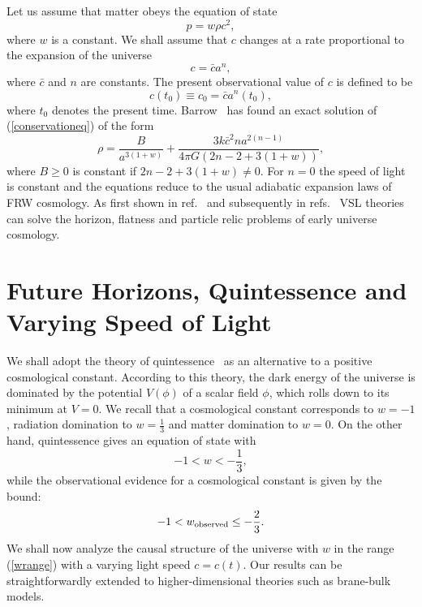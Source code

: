 \documentclass[a4paper,12pt]{article}
\begin{document}
Let us assume that matter obeys the equation of state
\begin{equation}
p=w\rho c^2,
\end{equation}
where $w$ is a constant. We shall assume that $c$ changes at a rate
proportional to the expansion of the universe
\begin{equation}
c={\bar c}a^n,
\end{equation}
where ${\bar c}$ and $n$ are constants. The present observational value of
$c$ is defined to be
\begin{equation}
c(t_0)\equiv c_0={\bar c}a^n(t_0),
\end{equation}
where $t_0$ denotes the present time.
Barrow~\cite{Barrow} has found an exact
solution of (\ref{conservationeq}) of the form
\begin{equation}
\rho=\frac{B}{a^{3(1+w)}}+\frac{3k{\bar c}^2na^{2(n-1)}} {4\pi
G(2n-2+3(1+w))},
\end{equation}
where $B \geq 0$ is constant if
$2n-2+3(1+w)\not= 0$. For $n=0$ the speed of light is constant and the
equations reduce to the usual adiabatic expansion laws of FRW cosmology. As
first shown in ref.~\cite{Moffat} and subsequently in
refs.~\cite{Albrecht,Barrow,Clayton} VSL theories can solve the horizon,
flatness and particle relic problems of early universe cosmology.

\section{\bf Future Horizons, Quintessence and Varying Speed of Light}

We shall adopt the theory of quintessence~\cite{Peebles} as an
alternative to a positive cosmological constant. According to this
theory, the dark energy of the universe is dominated by the potential
$V(\phi)$ of a scalar field $\phi$, which rolls down to its minimum at
$V=0$. We recall that a cosmological constant corresponds to $w=-1$,
radiation domination to $w=\frac{1}{3}$ and matter domination to $w=0$. On
the other hand, quintessence gives an equation of state with
\begin{equation}
\label{wrange} -1 < w < -\frac{1}{3},
\end{equation} while
the observational evidence for a cosmological constant is given by the
bound:
\begin{equation}
-1 < w_{\rm observed} \leq -\frac{2}{3}.
\end{equation}
We shall now analyze the causal structure of the universe
with $w$ in the range (\ref{wrange}) with a varying light speed $c=c(t)$.
Our results can be straightforwardly extended to higher-dimensional
theories such as brane-bulk models.
\end{document}
